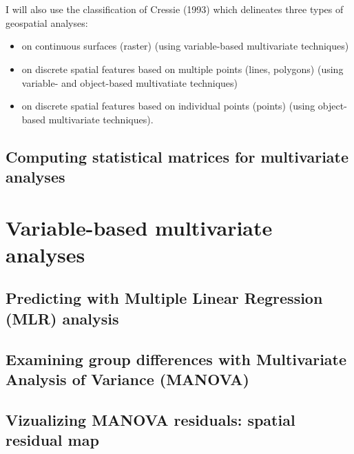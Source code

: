 \documentclass {article}
\begin{document}
\\
\\
I will also use the classification of Cressie (1993) \cite{cressie_statistics_1993} which delineates three types of geospatial analyses:
\begin{itemize}
\item on continuous surfaces (raster) (using variable-based multivariate techniques)
\item on discrete spatial features based on multiple points (lines, polygons) (using variable- and object-based multivatiate techniques)
\item on discrete spatial features based on individual points (points) (using object-based multivariate techniques).
\end{itemize}

\subsection {Computing statistical matrices for multivariate analyses}


\section {Variable-based multivariate analyses}

\subsection{Predicting with Multiple Linear Regression (MLR) analysis}

\subsection {Examining group differences with Multivariate Analysis of Variance (MANOVA)}

\subsection {Vizualizing MANOVA residuals: spatial residual map}
\end{document}
